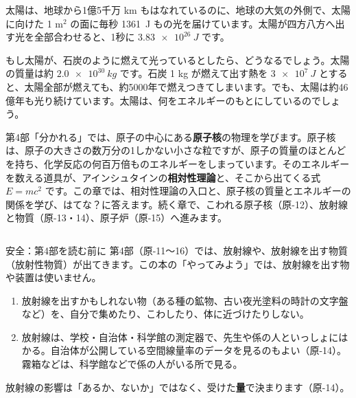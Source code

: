 \begin{hatena}
\noindent\begin{minipage}[c]{0.56\linewidth}\raggedright
太陽は、地球から1億5千万 km もはなれているのに、地球の大気の外側で、太陽に向けた 1 m$^2$ の面に毎秒 \qty{1361}{J} もの光を届けています。太陽が四方八方へ出す光を全部合わせると、1秒に $\qty{3.83e26}{J}$ です。

もし太陽が、石炭のように燃えて光っているとしたら、どうなるでしょう。太陽の質量は約 $\qty{2.0e30}{kg}$ です。石炭 1 kg が燃えて出す熱を $\qty{3e7}{J}$ とすると、太陽全部が燃えても、約5000年で燃えつきてしまいます。でも、太陽は約46億年も光り続けています。太陽は、何をエネルギーのもとにしているのでしょう。
\end{minipage}\hfill
\begin{minipage}[c]{0.41\linewidth}\centering
{}
\end{minipage}
\end{hatena}

\noindent 第4部「分かれる」では、原子の中心にある\textbf{原子核}の物理を学びます。原子核は、原子の大きさの数万分の1しかない小さな粒ですが、原子の質量のほとんどを持ち、化学反応の何百万倍ものエネルギーをしまっています。そのエネルギーを数える道具が、アインシュタインの\textbf{相対性理論}と、そこから出てくる式 $E=mc^2$ です。この章では、相対性理論の入口と、原子核の質量とエネルギーの関係を学び、はてな？に答えます。続く章で、こわれる原子核（原-12）、放射線と物質（原-13・14）、原子炉（原-15）へ進みます。

\begin{column}{安全：第4部を読む前に}
第4部（原-11〜16）では、放射線や、放射線を出す物質（放射性物質）が出てきます。この本の「やってみよう」では、放射線を出す物や装置は使いません。
\begin{enumerate}[label={\bkcircled{\arabic*}}, leftmargin=2.4\zw, itemsep=0pt, topsep=2pt]
\item 放射線を出すかもしれない物（ある種の鉱物、古い夜光塗料の時計の文字盤など）を、自分で集めたり、こわしたり、体に近づけたりしない。
\item 放射線は、学校・自治体・科学館の測定器で、先生や係の人といっしょにはかる。自治体が公開している空間線量率のデータを見るのもよい（原-14）。霧箱などは、科学館などで係の人がいる所で見る。
\end{enumerate}
放射線の影響は「あるか、ないか」ではなく、受けた\textbf{量}で決まります（原-14）。
\end{column}

